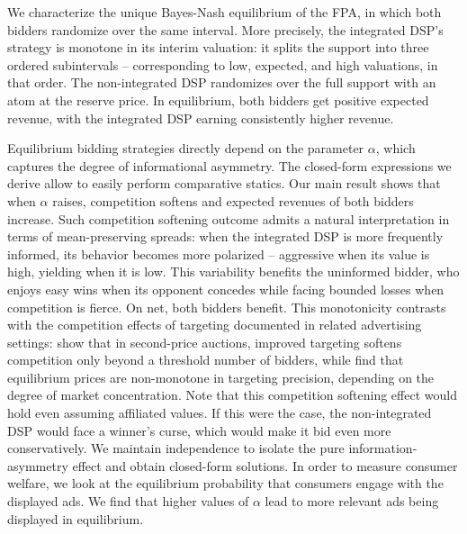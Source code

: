 We characterize the unique Bayes-Nash equilibrium of the FPA, in which both bidders randomize over the same interval. More precisely, the integrated DSP's strategy is monotone in its interim valuation: it splits the support into three ordered subintervals -- corresponding to low, expected, and high valuations, in that order. The non-integrated DSP randomizes over the full support with an atom at the reserve price. In equilibrium, both bidders get positive expected revenue, with the integrated DSP earning consistently higher revenue. \par
Equilibrium bidding strategies directly depend on the parameter $ \alpha $, which captures the degree of informational asymmetry. The closed-form expressions we derive allow to easily perform comparative statics. Our main result shows that when $ \alpha $ raises, competition softens and expected revenues of both bidders increase. Such competition softening outcome admits a natural interpretation in terms of mean-preserving spreads: when the integrated DSP is more frequently informed, its behavior becomes more polarized -- aggressive when its value is high, yielding when it is low. This variability benefits the uninformed bidder, who enjoys easy wins when its opponent concedes while facing bounded losses when competition is fierce. On net, both bidders benefit. This monotonicity contrasts with the competition effects of targeting documented in related advertising settings: \textcite{hummelWhenDoesImproved2017} show that in second-price auctions, improved targeting softens competition only beyond a threshold number of bidders, while \textcite{bergemannTargetingAdvertisingMarkets2011} find that equilibrium prices are non-monotone in targeting precision, depending on the degree of market concentration. Note that this competition softening effect would hold even assuming affiliated values. If this were the case, the non-integrated DSP would face a winner's curse, which would make it bid even more conservatively. We maintain independence to isolate the pure information-asymmetry effect and obtain closed-form solutions. In order to measure consumer welfare, we look at the equilibrium probability that consumers engage with the displayed ads. We find that higher values of $ \alpha $ lead to more relevant ads being displayed in equilibrium. \par

